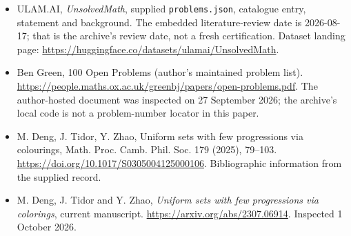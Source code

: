 \documentclass[11pt,a4paper]{article}
\begin{document}
{\small

\begin{itemize}

\item[\hypertarget{source:statement:1}{S1}] ULAM.AI, \emph{UnsolvedMath}, supplied \texttt{problems.json}, catalogue entry, statement and background. The embedded literature-review date is 2026-08-17; that is the archive’s review date, not a fresh certification. Dataset landing page: \url{https://huggingface.co/datasets/ulamai/UnsolvedMath}.

\item[\hypertarget{source:statement:2}{S2}] Ben Green, 100 Open Problems (author’s maintained problem list). \url{https://people.maths.ox.ac.uk/greenbj/papers/open-problems.pdf}. The author-hosted document was inspected on 27 September 2026; the archive’s local code is not a problem-number locator in this paper.

\item[\hypertarget{source:statement:3}{S3}] M. Deng, J. Tidor, Y. Zhao, Uniform sets with few progressions via colourings, Math. Proc. Camb. Phil. Soc. 179 (2025), 79--103. \url{https://doi.org/10.1017/S0305004125000106}. Bibliographic information from the supplied record.

\item[E1] M. Deng, J. Tidor and Y. Zhao, \emph{Uniform sets with few progressions via colorings}, current manuscript. \url{https://arxiv.org/abs/2307.06914}. Inspected 1 October 2026.

\end{itemize}

}

\label{end:statement}
\end{document}

